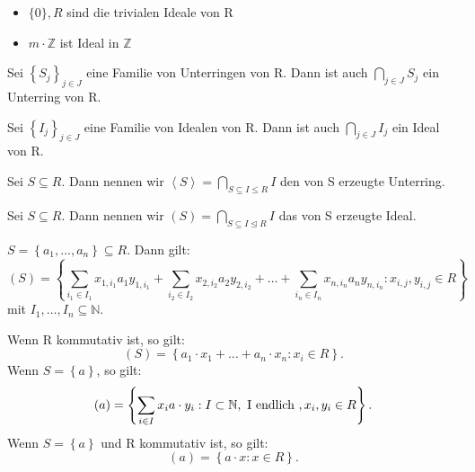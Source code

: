 \documentclass[10pt]{scrbook}
\begin{document}
\begin{Bsp}
\begin{itemize}
	\item $\{0\}, R$ sind die trivialen Ideale von R
	\item $m\cdot \mathbb{Z}$ ist Ideal in $\mathbb{Z}$
\end{itemize}
\end{Bsp}

\begin{Le}
Sei $\left\{S_j\right\}_{j\in J}$ eine Familie von Unterringen von R. Dann ist auch $\bigcap\limits_{j\in J}{S_j}$ ein Unterring von R.
\end{Le}

\begin{Le}
Sei $\left\{I_j\right\}_{j\in J}$ eine Familie von Idealen von R. Dann ist auch $\bigcap\limits_{j\in J}{I_j}$ ein Ideal von R.
\end{Le}

\begin{Def}
Sei $S\subseteq R$. Dann nennen wir $\left\langle S\right\rangle=\bigcap\limits_{S\subseteq I\leq R} {I}$ den von S erzeugte Unterring.
\end{Def}

\begin{Def}
Sei $S\subseteq R$. Dann nennen wir $\left(S\right)=\bigcap\limits_{S\subseteq I\trianglelefteq R} {I}$ das von S erzeugte Ideal.
\end{Def}

\begin{Sa}
$S=\left\{a_1, \ldots, a_n\right\}\subseteq R$. Dann gilt:
\begin{displaymath}
	\left(S\right)=\left\{\sum\limits_{i_1\in I_1}{x_{1, i_1} a_1 y_{1, i_1}} + \sum\limits_{i_2\in I_2}{x_{2, i_2} a_2 y_{2, i_2}} + \ldots + \sum\limits_{i_n\in I_n}{x_{n, i_n} a_n y_{n, i_n}}: x_{i, j}, y_{i, j}\in R\right\}
\end{displaymath}
mit $I_1, \ldots, I_n\subseteq \mathbb{N}$.

Wenn R kommutativ ist, so gilt:
\begin{displaymath}
	\left(S\right)=\left\{a_1\cdot x_1+\ldots+a_n\cdot x_n: x_i\in R\right\}.
\end{displaymath}
Wenn $S=\left\{a\right\}$, so gilt: 
\begin{displaymath}
\left(a\right)=\left\{\sum_{i\in I} x_i a \cdot y_i: I\subset \mathbb{N},\textnormal{ I endlich }, x_i, y_i\in R\right\}.
\end{displaymath}
Wenn $S=\left\{a\right\}$ und R kommutativ ist, so gilt: 
\begin{displaymath}
\left(a\right)=\left\{a \cdot x: x\in R\right\}.
\end{displaymath}
\end{Sa}
\end{document}
